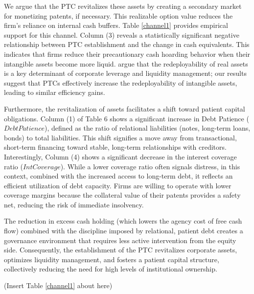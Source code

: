 \documentclass[12pt,a4paper]{article}
\begin{document}
We argue that the PTC revitalizes these assets by creating a secondary market for monetizing patents, if necessary. This realizable option value reduces the firm's reliance on internal cash buffers. Table \ref{channel1} provides empirical support for this channel. Column (3) reveals a statistically significant negative relationship between PTC establishment and the change in cash equivalents. This indicates that firms reduce their precautionary cash hoarding behavior when their intangible assets become more liquid. \cite{campello2013real} argue that the redeployability of real assets is a key determinant of corporate leverage and liquidity management; our results suggest that PTCs effectively increase the redeployability of intangible assets, leading to similar efficiency gains.

Furthermore, the revitalization of assets facilitates a shift toward patient capital obligations. Column (1) of Table 6 shows a significant increase in Debt Patience ($DebtPatience$), defined as the ratio of relational liabilities (notes, long-term loans, bonds) to total liabilities. This shift signifies a move away from transactional, short-term financing toward stable, long-term relationships with creditors. Interestingly, Column (4) shows a significant decrease in the interest coverage ratio ($IntCoverage$). While a lower coverage ratio often signals distress, in this context, combined with the increased access to long-term debt, it reflects an efficient utilization of debt capacity. Firms are willing to operate with lower coverage margins because the collateral value of their patents provides a safety net, reducing the risk of immediate insolvency.

The reduction in excess cash holding (which lowers the agency cost of free cash flow) combined with the discipline imposed by relational, patient debt creates a governance environment that requires less active intervention from the equity side. Consequently, the establishment of the PTC revitalizes corporate assets, optimizes liquidity management, and fosters a patient capital structure, collectively reducing the need for high levels of institutional ownership.

\begin{center}
    (Insert Table \ref{channel1} about here)
\end{center}
\end{document}
